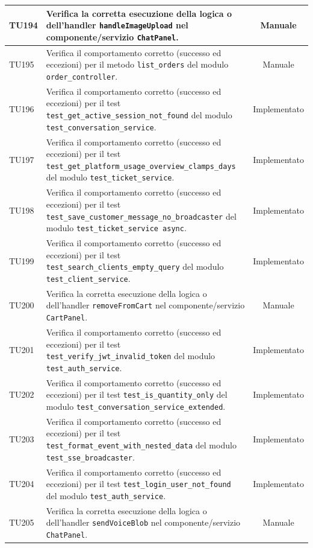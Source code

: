 \documentclass[a4paper,11pt,oneside]{scrartcl}
\begin{document}
\begin{longtable}{|p{1.9cm}|p{11.6cm}|c|}
    TU194 & Verifica la corretta esecuzione della logica o dell'handler \texttt{handleImageUpload} nel componente/servizio \texttt{ChatPanel}. & Manuale \\ \hline
    TU195 & Verifica il comportamento corretto (successo ed eccezioni) per il metodo \texttt{list\_orders} del modulo \texttt{order\_controller}. & Manuale \\ \hline
    TU196 & Verifica il comportamento corretto (successo ed eccezioni) per il test \texttt{test\_get\_active\_session\_not\_found} del modulo \texttt{test\_conversation\_service}. & Implementato \\ \hline
    TU197 & Verifica il comportamento corretto (successo ed eccezioni) per il test \texttt{test\_get\_platform\_usage\_overview\_clamps\_days} del modulo \texttt{test\_ticket\_service}. & Implementato \\ \hline
    TU198 & Verifica il comportamento corretto (successo ed eccezioni) per il test \texttt{test\_save\_customer\_message\_no\_broadcaster} del modulo \texttt{test\_ticket\_service     async}. & Implementato \\ \hline
    TU199 & Verifica il comportamento corretto (successo ed eccezioni) per il test \texttt{test\_search\_clients\_empty\_query} del modulo \texttt{test\_client\_service}. & Implementato \\ \hline
    TU200 & Verifica la corretta esecuzione della logica o dell'handler \texttt{removeFromCart} nel componente/servizio \texttt{CartPanel}. & Manuale \\ \hline
    TU201 & Verifica il comportamento corretto (successo ed eccezioni) per il test \texttt{test\_verify\_jwt\_invalid\_token} del modulo \texttt{test\_auth\_service}. & Implementato \\ \hline
    TU202 & Verifica il comportamento corretto (successo ed eccezioni) per il test \texttt{test\_is\_quantity\_only} del modulo \texttt{test\_conversation\_service\_extended}. & Implementato \\ \hline
    TU203 & Verifica il comportamento corretto (successo ed eccezioni) per il test \texttt{test\_format\_event\_with\_nested\_data} del modulo \texttt{test\_sse\_broadcaster}. & Implementato \\ \hline
    TU204 & Verifica il comportamento corretto (successo ed eccezioni) per il test \texttt{test\_login\_user\_not\_found} del modulo \texttt{test\_auth\_service}. & Implementato \\ \hline
    TU205 & Verifica la corretta esecuzione della logica o dell'handler \texttt{sendVoiceBlob} nel componente/servizio \texttt{ChatPanel}. & Manuale \\ \hline

\end{longtable}
\end{document}

